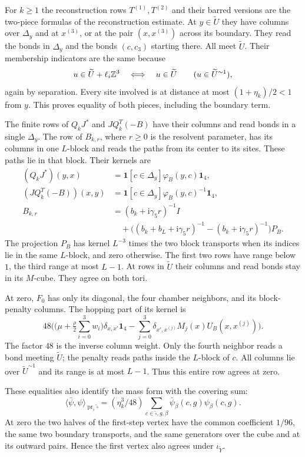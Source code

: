 For $k\ge1$ the reconstruction rows $T^{(1)},T^{(2)}$
and their barred versions are the two-piece formulas
of the reconstruction estimate. At $y\in\widetilde U$
they have columns over $\Delta_y$ and at $x^{(3)}$,
or at the pair $(x,x^{(3)})$ across its boundary.
They read the bonds in $\Delta_y$ and the bonds
$(c,c_3)$ starting there. All meet $\widetilde U$.
Their membership indicators are the same because
\[
 u\in\widetilde U+\ell_i\mathbb Z^3
       \quad\Longleftrightarrow\quad u\in\widetilde U
             \qquad(u\in\widetilde U^{\sim1}),
\]
again by separation. Every site involved is at
distance at most $(1+\eta_k)/2<1$ from $y$.
This proves equality of both pieces, including
the boundary term.

The finite rows of $Q_kJ^*$ and $JQ_k^T(-B)$ have
their columns and read bonds in a single $\Delta_y$.
The row of $B_{k,r}$, where $r\ge0$ is the resolvent
parameter, has its columns in one $L$-block and reads
the paths from its center to its sites.
These paths lie in that block. Their kernels are
\begin{align*}
 (Q_kJ^*)(y,x)&=\mathbf1[c\in\Delta_y]\varphi_B(y,c)\mathbf1_4,\\
 (JQ_k^T(-B))(x,y)&=\mathbf1[c\in\Delta_y]\varphi_B(y,c)^{-1}\mathbf1_4,\\
 B_{k,r}
   &=(b_k+\mathrm i\gamma_5r)^{-1}I\\
   &\quad+\big((b_k+b_L+\mathrm i\gamma_5r)^{-1}
                    -(b_k+\mathrm i\gamma_5r)^{-1}\big)P_B .
\end{align*}
The projection $P_B$ has kernel $L^{-3}$ times the two
block transports when its indices lie in the same
$L$-block, and zero otherwise. The first two rows
have range below $1$, the third range at most $L-1$.
At rows in $\widetilde U$ their columns and read
bonds stay in its $M$-cube. They agree on both tori.

At zero, $F_0$ has only its diagonal, the four chamber
neighbors, and its block-penalty columns. The hopping
part of its kernel is
\[
 48\Big(
  \bigl(\mu+\tfrac{\rho}{2}\sum_{i=0}^3w_i\bigr)\delta_{x,x'}\mathbf1_4
       -\sum_{j=0}^3\delta_{x',x^{(j)}}M_j(x)U_B(x,x^{(j)})
       \Big).
\]
The factor $48$ is the inverse column weight.
Only the fourth neighbor reads a bond meeting
$\widetilde U$; the penalty reads paths inside the
$L$-block of $c$. All columns lie over
$\widetilde U^{\sim1}$ and its range is at most $L-1$.
Thus this entire row agrees at zero.

These equalities also identify the mass form
with the covering sum:
\[
 \langle\bar\psi,\psi\rangle_{\operatorname{pr}_i\widetilde\square}
 =(\eta_k^3/48)\sum_{c\in\widetilde\square,g,\beta}
                          \bar\psi_\beta(c,g)\psi_\beta(c,g).
\]
At zero the two halves of the first-step vertex have
the common coefficient $1/96$, the same two boundary
transports, and the same generators over the cube
and at its outward pairs. Hence the first vertex
also agrees under $\iota_{\widetilde Y}$.

